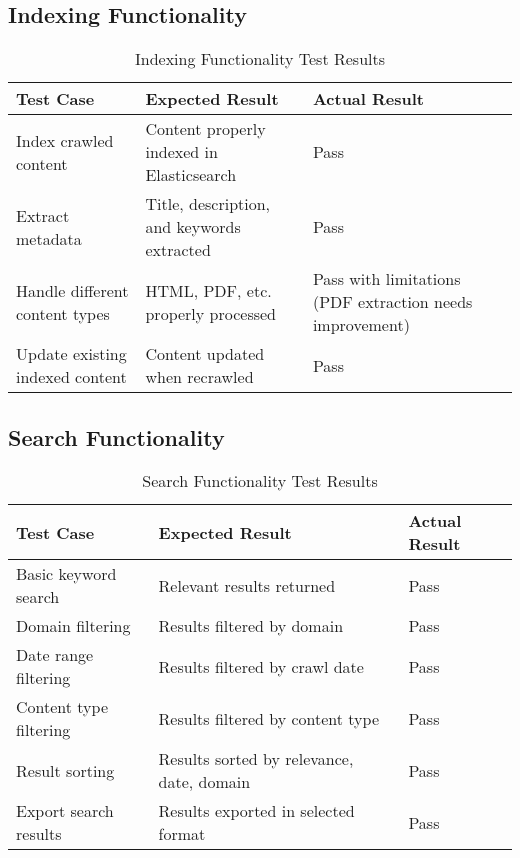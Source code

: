 \documentclass[12pt,a4paper]{report}
\begin{document}
\subsection{Indexing Functionality}
\begin{table}[H]
    \centering
    \begin{tabularx}{\textwidth}{|X|X|X|}
        \hline
        \textbf{Test Case} & \textbf{Expected Result} & \textbf{Actual Result} \\
        \hline
        Index crawled content & Content properly indexed in Elasticsearch & Pass \\
        \hline
        Extract metadata & Title, description, and keywords extracted & Pass \\
        \hline
        Handle different content types & HTML, PDF, etc. properly processed & Pass with limitations (PDF extraction needs improvement) \\
        \hline
        Update existing indexed content & Content updated when recrawled & Pass \\
        \hline
    \end{tabularx}
    \caption{Indexing Functionality Test Results}
\end{table}

\subsection{Search Functionality}
\begin{table}[H]
    \centering
    \begin{tabularx}{\textwidth}{|X|X|X|}
        \hline
        \textbf{Test Case} & \textbf{Expected Result} & \textbf{Actual Result} \\
        \hline
        Basic keyword search & Relevant results returned & Pass \\
        \hline
        Domain filtering & Results filtered by domain & Pass \\
        \hline
        Date range filtering & Results filtered by crawl date & Pass \\
        \hline
        Content type filtering & Results filtered by content type & Pass \\
        \hline
        Result sorting & Results sorted by relevance, date, domain & Pass \\
        \hline
        Export search results & Results exported in selected format & Pass \\
        \hline
    \end{tabularx}
    \caption{Search Functionality Test Results}
\end{table}
\end{document}
